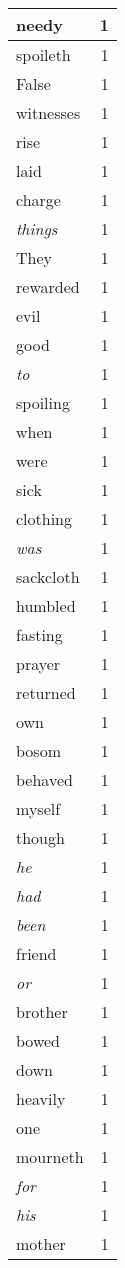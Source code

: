 \begin{center}
\begin{longtable}{l|r}
needy & 1 \\ \hline
spoileth & 1 \\ \hline
False & 1 \\ \hline
witnesses & 1 \\ \hline
rise & 1 \\ \hline
laid & 1 \\ \hline
charge & 1 \\ \hline
\emph{things} & 1 \\ \hline
They & 1 \\ \hline
rewarded & 1 \\ \hline
evil & 1 \\ \hline
good & 1 \\ \hline
\emph{to} & 1 \\ \hline
spoiling & 1 \\ \hline
when & 1 \\ \hline
were & 1 \\ \hline
sick & 1 \\ \hline
clothing & 1 \\ \hline
\emph{was} & 1 \\ \hline
sackcloth & 1 \\ \hline
humbled & 1 \\ \hline
fasting & 1 \\ \hline
prayer & 1 \\ \hline
returned & 1 \\ \hline
own & 1 \\ \hline
bosom & 1 \\ \hline
behaved & 1 \\ \hline
myself & 1 \\ \hline
though & 1 \\ \hline
\emph{he} & 1 \\ \hline
\emph{had} & 1 \\ \hline
\emph{been} & 1 \\ \hline
friend & 1 \\ \hline
\emph{or} & 1 \\ \hline
brother & 1 \\ \hline
bowed & 1 \\ \hline
down & 1 \\ \hline
heavily & 1 \\ \hline
one & 1 \\ \hline
mourneth & 1 \\ \hline
\emph{for} & 1 \\ \hline
\emph{his} & 1 \\ \hline
mother & 1 \\ \hline

\end{longtable}
\end{center}
